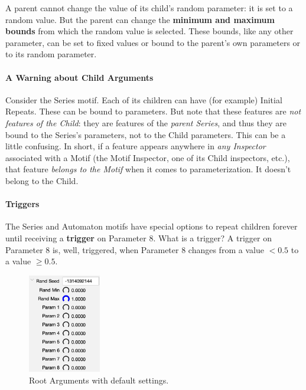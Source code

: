 \documentclass[twoside,10pt]{article}
\begin{document}
A parent cannot change the value of its child's random parameter: it is set to a random value.  But the parent can change the {\bf minimum and maximum bounds} from which the random value is selected.  These bounds, like any other parameter, can be set to fixed values or bound to the parent's own parameters or to its random parameter.

\paragraph{A Warning about Child Arguments}

Consider the Series motif. Each of its children can have (for example) Initial Repeats.  These can be bound to parameters.  But note that these features are {\it not features of the Child}: they are features of the {\it parent Series}, and thus they are bound to the Series's parameters, not to the Child parameters.  This can be a little confusing.  In short, if a feature appears anywhere in {\it any Inspector} associated with a Motif (the Motif Inspector, one of its Child inspectors, etc.), that feature {\it belongs to the Motif} when it comes to parameterization.  It doesn't belong to the Child.

\paragraph{Triggers} The Series and Automaton motifs have special options to repeat children forever until receiving a {\bf trigger} on Parameter 8.  What is a trigger?  A trigger on Parameter 8 is, well, triggered, when Parameter 8 changes from a value \(< 0.5\) to a value \(\geq 0.5\). 


\begin{figure}
\vspace{-1em}
\includegraphics[width=1.25in]{rootarguments}
\caption{Root Arguments with default settings.}
\vspace{-4em}
\label{rootarguments}
\end{figure}
\end{document}
